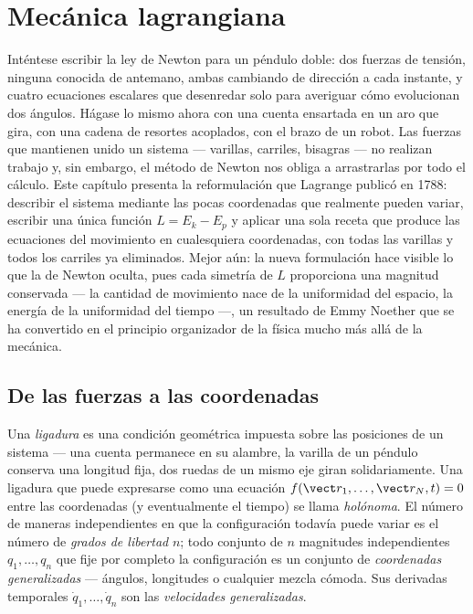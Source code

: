 \chapter{Mecánica lagrangiana}\label{ch:b3:lagrangian-mechanics}

Inténtese escribir la ley de Newton para un péndulo doble: dos fuerzas de
tensión, ninguna conocida de antemano, ambas cambiando de dirección a cada
instante, y cuatro ecuaciones escalares que desenredar solo para averiguar
cómo evolucionan dos ángulos. Hágase lo mismo ahora con una cuenta ensartada
en un aro que gira, con una cadena de resortes acoplados, con el brazo de un
robot. Las fuerzas que mantienen unido un sistema --- varillas, carriles,
bisagras --- no realizan trabajo y, sin embargo, el método de Newton nos
obliga a arrastrarlas por todo el cálculo. Este capítulo presenta la
reformulación que Lagrange publicó en 1788: describir el sistema mediante
las pocas coordenadas que realmente pueden variar, escribir una única
función $L = E_k - E_p$ y aplicar una sola receta que produce las ecuaciones
del movimiento en cualesquiera coordenadas, con todas las varillas y todos
los carriles ya eliminados. Mejor aún: la nueva formulación hace visible lo
que la de Newton oculta, pues cada simetría de $L$ proporciona una magnitud
conservada --- la cantidad de movimiento nace de la uniformidad del espacio,
la energía de la uniformidad del tiempo ---, un resultado de Emmy Noether
que se ha convertido en el principio organizador de la física mucho más allá
de la mecánica.

\section{De las fuerzas a las coordenadas}

\begin{definition}\label{def:b3:lagrangian-mechanics:coordinates}
Una \emph{ligadura} es una condición geométrica impuesta sobre las
posiciones de un sistema --- una cuenta permanece en su alambre, la varilla
de un péndulo conserva una longitud fija, dos ruedas de un mismo eje giran
solidariamente. Una ligadura que puede expresarse como una ecuación
$f(\vect r_1, \dots, \vect r_N, t) = 0$ entre las coordenadas (y
eventualmente el tiempo) se llama \emph{holónoma}. El número de maneras
independientes en que la configuración todavía puede variar es el número de
\emph{grados de libertad} $n$; todo conjunto de $n$ magnitudes
independientes $q_1, \dots, q_n$ que fije por completo la configuración es
un conjunto de \emph{coordenadas generalizadas} --- ángulos, longitudes o
cualquier mezcla cómoda. Sus derivadas temporales $\dot q_1, \dots, \dot q_n$
son las \emph{velocidades generalizadas}.
\end{definition}

